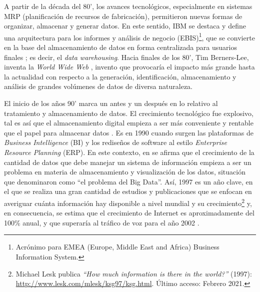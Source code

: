 \bigskip A partir de la década del 80’, los avances tecnológicos, especialmente en sistemas MRP (planificación de recursos de fabricación), permitieron nuevas formas de organizar, almacenar y generar datos. En este sentido, IBM se destaca y define una arquitectura para los informes y análisis de negocio (EBIS)\footnote{Acrónimo para EMEA (Europe, Middle East and Africa) Business Information System.}, que se convierte en la base del almacenamiento de datos en forma centralizada para usuarios finales \citep{devlin1988architecture}; es decir, el \textit{data warehousing}. Hacia finales de los 80’, Tim Berners-Lee, inventa la \textit{World Wide Web} \citep{berners1992world}, invento que provocaría el impacto más grande hasta la actualidad con respecto a la generación, identificación, almacenamiento y análisis de grandes volúmenes de datos de diversa naturaleza.

\bigskip El inicio de los años 90’ marca un antes y un después en lo relativo al tratamiento y almacenamiento de datos. El crecimiento tecnológico fue explosivo, tal es así que el almacenamiento digital empieza a ser más conveniente y rentable que el papel para almacenar datos \citep{morris2003evolution}. Es en 1990 cuando surgen las plataformas de \textit{Business Intelligence} (BI) y los rediseños de software al estilo \textit{Enterprise Resource Planning} (ERP). En este contexto, en \cite{cox1997application} se afirma que el crecimiento de la cantidad de datos que debe manejar un sistema de información empieza a ser un problema en materia de almacenamiento y visualización de los datos, situación que denominaron como “el problema del Big Data”. Así, 1997 es un año clave, en el que se realiza una gran cantidad de estudios y publicaciones que se enfocan en averiguar cuánta información hay disponible a nivel mundial y su crecimiento\footnote{Michael Lesk publica \textit{“How much information is there in the world?”} (1997): \url{http://www.lesk.com/mlesk/ksg97/ksg.html}. Último acceso: Febrero 2021.} y, en consecuencia, se estima que el crecimiento de Internet es aproximadamente del 100\% anual, y que superaría al tráfico de voz para el año 2002 \citep{coffman1998size}.

